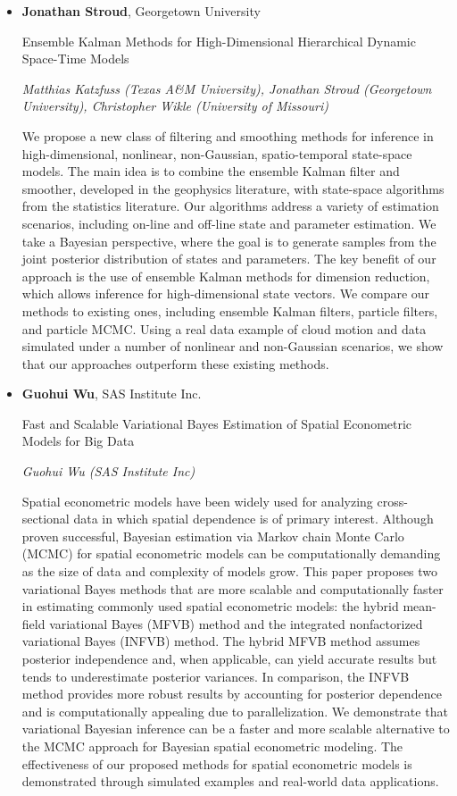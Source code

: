 \begin{itemize}
\item \textbf{Jonathan Stroud}, Georgetown University

Ensemble Kalman Methods for High-Dimensional Hierarchical Dynamic Space-Time Models

\emph{\footnotesize Matthias Katzfuss (Texas A\&M University), Jonathan Stroud (Georgetown University), Christopher Wikle (University of Missouri)}

We propose a new class of filtering and smoothing methods for inference in high-dimensional, nonlinear, non-Gaussian, spatio-temporal state-space models. The main idea is to combine the ensemble Kalman filter and smoother, developed in the geophysics literature, with state-space algorithms from the statistics literature. Our algorithms address a variety of estimation scenarios, including on-line and off-line state and parameter estimation. We take a Bayesian perspective, where  the goal is to generate samples from the joint posterior distribution of states and parameters. The key benefit of our approach is the use of ensemble Kalman methods for dimension reduction, which allows inference for high-dimensional state vectors. We compare our methods to existing ones, including ensemble Kalman filters, particle filters, and particle MCMC. Using a real data example of cloud motion and data simulated under a number of nonlinear and non-Gaussian scenarios, we show that our approaches outperform these existing methods.


\item \textbf{Guohui Wu}, SAS Institute Inc.

Fast and Scalable Variational Bayes Estimation of Spatial Econometric Models for Big Data

\emph{\footnotesize Guohui Wu (SAS Institute Inc)}

Spatial econometric models have been widely used for analyzing cross-sectional data in which spatial dependence is of primary interest. Although proven successful, Bayesian estimation via Markov chain Monte Carlo (MCMC) for spatial econometric models can be computationally demanding as the size of data and complexity of models grow. This paper proposes two variational Bayes methods that are more scalable and computationally faster in estimating commonly used spatial econometric models: the hybrid mean-field variational Bayes (MFVB) method and the integrated nonfactorized variational Bayes (INFVB) method. The hybrid MFVB method assumes posterior independence and, when applicable, can yield accurate results but tends to underestimate posterior variances. In comparison, the INFVB method provides more robust results by accounting for posterior dependence and is computationally appealing due to parallelization. We demonstrate that variational Bayesian inference can be a faster and more scalable alternative to the MCMC approach for Bayesian spatial econometric modeling. The effectiveness of our proposed methods for spatial econometric models is demonstrated through simulated examples and real-world data applications.

\end{itemize}

